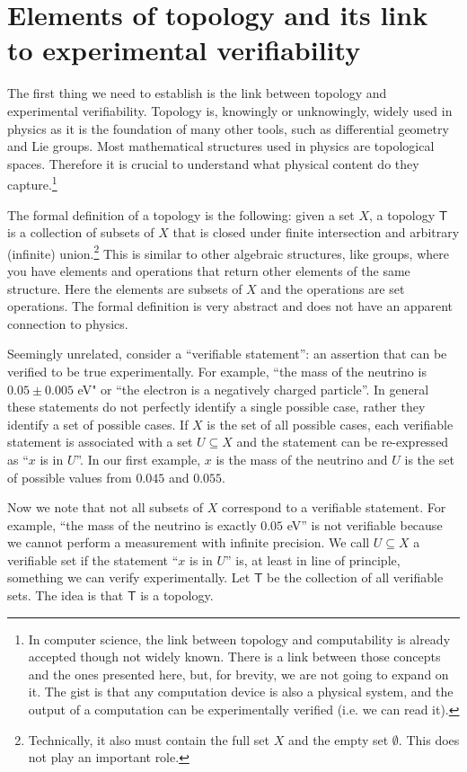 \documentclass[12pt]{iopart}
\begin{document}
\section{Elements of topology and its link to experimental verifiability}

The first thing we need to establish is the link between topology and experimental verifiability. Topology is, knowingly or unknowingly, widely used in physics as it is the foundation of many other tools, such as differential geometry and Lie groups. Most mathematical structures used in physics are topological spaces. Therefore it is crucial to understand what physical content do they capture.\footnote{In computer science, the link between topology and computability is already accepted though not widely known. There is a link between those concepts and the ones presented here, but, for brevity, we are not going to expand on it. The gist is that any computation device is also a physical system, and the output of a computation can be experimentally verified (i.e. we can read it).}

The formal definition of a topology is the following: given a set $X$, a topology $\mathsf{T}$ is a collection of subsets of $X$ that is closed under finite intersection and arbitrary (infinite) union.\footnote{Technically, it also must contain the full set $X$ and the empty set $\emptyset$. This does not play an important role.} This is similar to other algebraic structures, like groups, where you have elements and operations that return other elements of the same structure. Here the elements are subsets of $X$ and the operations are set operations. The formal definition is very abstract and does not have an apparent connection to physics.

Seemingly unrelated, consider a ``verifiable statement'': an assertion that can be verified to be true experimentally. For example, ``the mass of the neutrino is $0.05 \pm 0.005$ eV" or ``the electron is a negatively charged particle''. In general these statements do not perfectly identify a single possible case, rather they identify a set of possible cases. If $X$ is the set of all possible cases, each verifiable statement is associated with a set $U \subseteq X$ and the statement can be re-expressed as ``$x$ is in $U$''. In our first example, $x$ is the mass of the neutrino and $U$ is the set of possible values from $0.045$ and $0.055$.

Now we note that not all subsets of $X$ correspond to a verifiable statement. For example, ``the mass of the neutrino is exactly $0.05$ eV'' is not verifiable because we cannot perform a measurement with infinite precision. We call $U \subseteq X$ a verifiable set if the statement ``$x$ is in $U$'' is, at least in line of principle, something we can verify experimentally. Let $\mathsf{T}$ be the collection of all verifiable sets. The idea is that $\mathsf{T}$ is a topology.
\end{document}
